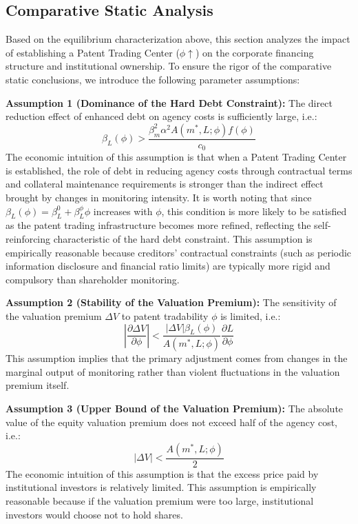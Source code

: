 \documentclass[12pt,a4paper]{article}
\begin{document}
\subsection{Comparative Static Analysis}
Based on the equilibrium characterization above, this section analyzes the impact of establishing a Patent Trading Center ($\phi \uparrow$) on the corporate financing structure and institutional ownership. To ensure the rigor of the comparative static conclusions, we introduce the following parameter assumptions:

\textbf{Assumption 1 (Dominance of the Hard Debt Constraint):} The direct reduction effect of enhanced debt on agency costs is sufficiently large, i.e.:
\begin{equation}
\beta_L(\phi) > \frac{\beta_m^2 \alpha^2 A(m^*, L; \phi) f(\phi)}{c_0}
\end{equation}
The economic intuition of this assumption is that when a Patent Trading Center is established, the role of debt in reducing agency costs through contractual terms and collateral maintenance requirements is stronger than the indirect effect brought by changes in monitoring intensity. It is worth noting that since $\beta_L(\phi) = \beta_L^0 + \beta_L^\phi \phi$ increases with $\phi$, this condition is more likely to be satisfied as the patent trading infrastructure becomes more refined, reflecting the self-reinforcing characteristic of the hard debt constraint. This assumption is empirically reasonable because creditors' contractual constraints (such as periodic information disclosure and financial ratio limits) are typically more rigid and compulsory than shareholder monitoring.

\textbf{Assumption 2 (Stability of the Valuation Premium):} The sensitivity of the valuation premium $\Delta V$ to patent tradability $\phi$ is limited, i.e.:
\begin{equation}
\left| \frac{\partial \Delta V}{\partial \phi} \right| < \frac{|\Delta V| \beta_L(\phi)}{ A(m^*, L; \phi) } \frac{\partial L}{\partial \phi}
\end{equation}
This assumption implies that the primary adjustment comes from changes in the marginal output of monitoring rather than violent fluctuations in the valuation premium itself.

\textbf{Assumption 3 (Upper Bound of the Valuation Premium):} The absolute value of the equity valuation premium does not exceed half of the agency cost, i.e.:
\begin{equation}
|\Delta V| < \frac{A(m^*, L; \phi)}{2}
\end{equation}
The economic intuition of this assumption is that the excess price paid by institutional investors is relatively limited. This assumption is empirically reasonable because if the valuation premium were too large, institutional investors would choose not to hold shares.
\end{document}
